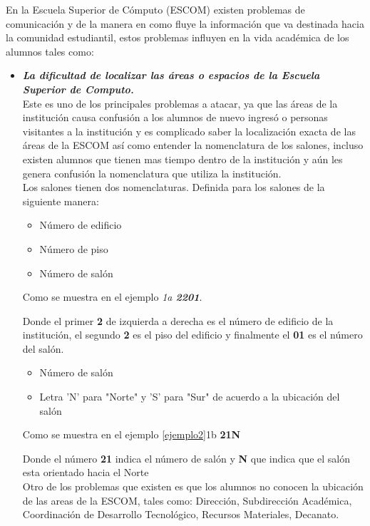 	En la Escuela Superior de Cómputo (ESCOM) existen problemas de comunicación y de la manera en como fluye la información que va destinada hacia la comunidad estudiantil, estos problemas influyen en la vida académica de los alumnos tales como:
	\begin{itemize}
		\item \textbf{\textit{La dificultad de localizar las áreas o espacios de la Escuela Superior de Computo.}}\\
		
		Este es uno de los principales problemas a atacar, ya que las áreas de la institución causa confusión a los alumnos de nuevo ingresó o personas visitantes a la institución y es complicado saber la localización exacta de las áreas de la ESCOM así como entender la nomenclatura de los salones, incluso existen alumnos que tienen mas tiempo dentro de la institución y aún les genera confusión la nomenclatura que utiliza la institución.\\ 
		
		Los salones tienen dos nomenclaturas. Definida para los salones de la siguiente manera:
		\begin{itemize}
			\item Número de edificio
			\item Número de piso
			\item Número de salón
		\end{itemize}
		
		Como se muestra en el ejemplo \textit{1a \textbf{2201}}.
		
		Donde el primer \textbf{2} de izquierda a derecha es el número de edificio de la institución, el segundo \textbf{2} es el piso del edificio y finalmente el \textbf{01} es el número del salón.\\
		
		\begin{itemize}
			\item Número de salón
			\item Letra 'N' para "Norte"  y  'S' para "Sur" de acuerdo a  la ubicación del salón
		\end{itemize}
		
		Como se muestra en el ejemplo \ref{ejemplo2}{1b} \textbf{21N} \label{ejemplo2} 
		
		Donde el número \textbf{21} indica el número de salón y \textbf{N} que indica que el salón esta orientado hacia el Norte\\
		
		Otro de los problemas que existen es que los alumnos no conocen la ubicación de las areas de la ESCOM, tales como: Dirección, Subdirección Académica, Coordinación de Desarrollo Tecnológico, Recursos Materiales, Decanato.\\ 
		

\end{itemize}
